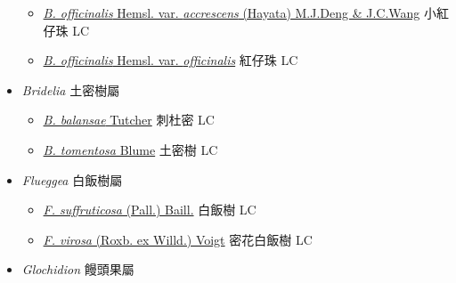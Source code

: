 \begin{itemize}
  \begin{itemize}
        \item[] \href{http://www.theplantlist.org/tpl1.1/search?q=Breynia+officinalis+var.+accrescens}{\textit{B. officinalis} Hemsl. var. \textit{accrescens} (Hayata) M.J.Deng \& J.C.Wang}   小紅仔珠   LC
        \item[] \href{http://www.theplantlist.org/tpl1.1/search?q=Breynia+officinalis+var.+officinalis}{\textit{B. officinalis} Hemsl. var. \textit{officinalis}}   紅仔珠   LC
  \end{itemize}
 \item[] \textit{Bridelia} 土密樹屬
                                
  \begin{itemize}
        \item[] \href{http://www.theplantlist.org/tpl1.1/search?q=Bridelia+balansae}{\textit{B. balansae} Tutcher}   刺杜密   LC
        \item[] \href{http://www.theplantlist.org/tpl1.1/search?q=Bridelia+tomentosa}{\textit{B. tomentosa} Blume}   土密樹   LC
  \end{itemize}
 \item[] \textit{Flueggea} 白飯樹屬
                                
  \begin{itemize}
        \item[] \href{http://www.theplantlist.org/tpl1.1/search?q=Flueggea+suffruticosa}{\textit{F. suffruticosa} (Pall.) Baill.}   白飯樹   LC
        \item[] \href{http://www.theplantlist.org/tpl1.1/search?q=Flueggea+virosa}{\textit{F. virosa} (Roxb. ex Willd.) Voigt}   密花白飯樹   LC
  \end{itemize}
 \item[] \textit{Glochidion} 饅頭果屬
                                

\end{itemize}
